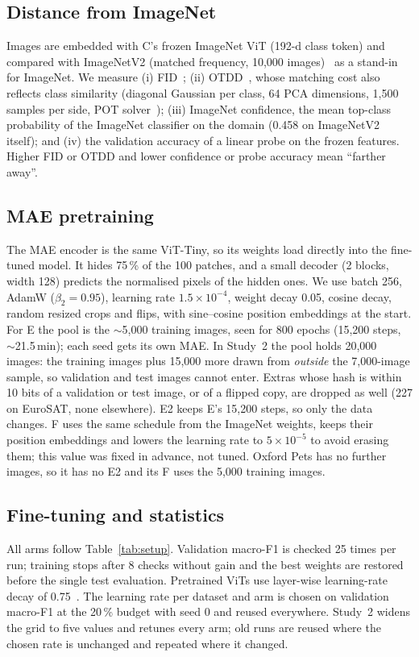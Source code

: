 \documentclass[conference]{IEEEtran}
\begin{document}
\subsection{Distance from ImageNet}
Images are embedded with C's frozen ImageNet ViT (192-d class token) and compared with ImageNetV2 (matched
frequency, 10,000 images)~\cite{recht2019imagenetv2} as a stand-in for ImageNet. We measure (i)
FID~\cite{heusel2017fid}; (ii) OTDD~\cite{alvarezmelis2020otdd}, whose matching cost also reflects class similarity
(diagonal Gaussian per class, 64 PCA dimensions, 1,500 samples per side, POT solver~\cite{flamary2021pot}); (iii)
ImageNet confidence, the mean top-class probability of the ImageNet classifier on the domain (0.458 on ImageNetV2
itself); and (iv) the validation accuracy of a linear probe on the frozen features. Higher FID or OTDD and lower
confidence or probe accuracy mean ``farther away''.

\subsection{MAE pretraining}
The MAE encoder is the same ViT-Tiny, so its weights load directly into the fine-tuned model. It hides 75\,\% of
the 100 patches, and a small decoder (2 blocks, width 128) predicts the normalised pixels of the hidden ones. We use
batch 256, AdamW ($\beta_2 = 0.95$), learning rate $1.5\times10^{-4}$, weight decay 0.05, cosine decay, random
resized crops and flips, with sine--cosine position embeddings at the start. For E the pool is the $\sim$5,000
training images, seen for 800 epochs (15,200 steps, $\sim$21.5\,min); each seed gets its own MAE.
In Study~2 the pool holds 20,000 images: the training images plus 15,000 more drawn from \emph{outside} the
7,000-image sample, so validation and test images cannot enter. Extras whose hash is within 10 bits of a validation
or test image, or of a flipped copy, are dropped as well (227 on EuroSAT, none elsewhere). E2 keeps E's 15,200
steps, so only the data changes. F uses the same schedule from the ImageNet weights, keeps their position
embeddings and lowers the learning rate to $5\times10^{-5}$ to avoid erasing them; this value was fixed in advance,
not tuned. Oxford Pets has no further images, so it has no E2 and its F uses the 5,000 training images.

\subsection{Fine-tuning and statistics}
All arms follow Table~\ref{tab:setup}. Validation macro-F1 is checked 25 times per run; training stops after 8
checks without gain and the best weights are restored before the single test evaluation. Pretrained ViTs use
layer-wise learning-rate decay of 0.75~\cite{bao2022beit}. The learning rate per dataset and arm is chosen on
validation macro-F1 at the 20\,\% budget with seed 0 and reused everywhere. Study~2 widens the grid to five values
and retunes every arm; old runs are reused where the chosen rate is unchanged and repeated where it changed.
\end{document}

